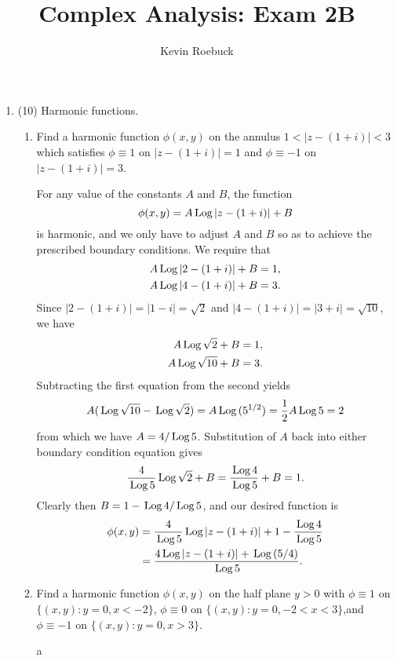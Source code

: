 \documentclass[12pt]{article}
\newcommand{\Log}{\text{\,Log\,}}
\begin{document}
\title{Complex Analysis: Exam 2B}
\author{Kevin Roebuck}
\maketitle

\begin{enumerate}


\item (10) Harmonic functions.
\begin{enumerate}
  \item Find a harmonic function $\phi(x,y)$ on the annulus $1<|z-(1+i)|<3$ which satisfies $\phi\equiv 1$ on $|z-(1+i)|=1$ and $\phi\equiv-1$ on $|z-(1+i)|=3$.

  \begin{mdframed}
  For any value of the constants $A$ and $B$, the function $$\phi(x,y) = A\Log |z - (1 + i)| + B$$ is harmonic, and we only have to adjust $A$ and $B$ so as to achieve the prescribed boundary conditions. We require that
  \begin{align*}
    A\Log|2 - (1 + i)| + B &= 1, \\
    A\Log|4 - (1 + i)| + B &= 3.
  \end{align*}
  Since $|2 - (1 + i)| = |1 - i| = \sqrt 2$ and $|4 - (1 + i)| = |3 + i| = \sqrt{10}$, we have
  \begin{align*}
    A\Log\sqrt 2 + B &= 1, \\
    A\Log\sqrt{10} + B &= 3.
  \end{align*}
  Subtracting the first equation from the second yields $$A(\Log\sqrt{10} - \Log\sqrt 2) = A\Log(5^{1/2}) = \frac{1}{2}A\Log 5 = 2$$
  from which we have $A = 4 / \Log 5$. Substitution of $A$ back into either boundary condition equation gives $$\frac{4}{\Log 5}\Log\sqrt 2 + B = \frac{\Log 4}{\Log 5} + B = 1.$$ Clearly then $B = 1 - \Log 4 / \Log 5$, and our desired function is
  \begin{align*}
  \phi(x,y) &= \frac{4}{\Log 5}\Log |z - (1 + i)| + 1 - \frac{\Log 4}{\Log 5} \\
  &= \frac{4\Log|z - (1 + i)| + \Log(5/4)}{\Log 5}.
  \end{align*}
  \end{mdframed}

  \item Find a harmonic function $\phi(x,y)$ on the half plane $y>0$ with $\phi\equiv 1$ on $\{(x,y):y=0, x<-2\}$, $\phi\equiv 0$ on $\{(x,y):y=0, -2<x<3\}$,and $\phi\equiv -1$ on $\{(x,y):y=0, x>3\}$.

  \begin{mdframed}
  a
  \end{mdframed}
\end{enumerate}


\end{enumerate}
\end{document}
